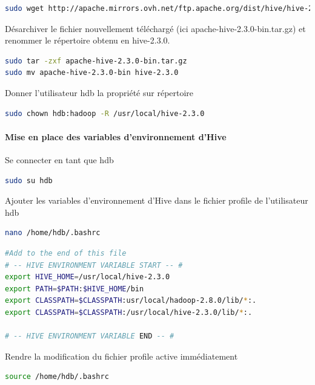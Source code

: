 \documentclass[12pt,english]{book}
\begin{document}
\begin{lstlisting}[language=bash, frame=single]
sudo wget http://apache.mirrors.ovh.net/ftp.apache.org/dist/hive/hive-2.3.0/apache-hive-2.3.0-bin.tar.gz
\end{lstlisting}

Désarchiver le fichier nouvellement téléchargé (ici apache-hive-2.3.0-bin.tar.gz) et renommer le répertoire obtenu en hive-2.3.0.

\begin{lstlisting}[language=bash, frame=single]
sudo tar -zxf apache-hive-2.3.0-bin.tar.gz
sudo mv apache-hive-2.3.0-bin hive-2.3.0
\end{lstlisting}

Donner l’utilisateur hdb la propriété sur répertoire

\begin{lstlisting}[language=bash, frame=single]
sudo chown hdb:hadoop -R /usr/local/hive-2.3.0
\end{lstlisting}

\paragraph{Mise en place des variables d’environnement d’Hive}

Se connecter en tant que hdb

\begin{lstlisting}[language=bash, frame=single]
sudo su hdb
\end{lstlisting}

Ajouter les variables d’environnement d’Hive dans le fichier profile de l’utilisateur hdb

\begin{lstlisting}[language=bash, frame=single]
nano /home/hdb/.bashrc
\end{lstlisting}

\begin{lstlisting}[language=bash, frame=single]
#Add to the end of this file 
# -- HIVE ENVIRONMENT VARIABLE START -- #
export HIVE_HOME=/usr/local/hive-2.3.0
export PATH=$PATH:$HIVE_HOME/bin
export CLASSPATH=$CLASSPATH:usr/local/hadoop-2.8.0/lib/*:.
export CLASSPATH=$CLASSPATH:/usr/local/hive-2.3.0/lib/*:.

# -- HIVE ENVIRONMENT VARIABLE END -- #
\end{lstlisting}

Rendre la modification du fichier profile active immédiatement
\begin{lstlisting}[language=bash, frame=single]
source /home/hdb/.bashrc
\end{lstlisting}
\end{document}
